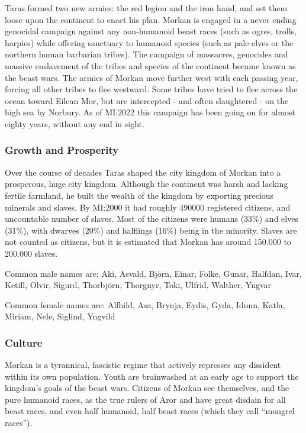 Taras formed two new armies: the red legion and the iron hand, and set them
loose upon the continent to enact his plan. Morkan is engaged in a never
ending genocidal campaign against any non-humanoid beast races (such as ogres,
trolls, harpies) while offering sanctuary to humanoid species (such as pale
elves or the northern human barbarian tribes). The campaign of massacres,
genocides and massive enslavement of the tribes and species of the continent
became known as the beast wars. The armies of Morkan move further west with
each passing year, forcing all other tribes to flee westward. Some tribes have
tried to flee across the ocean toward Eilean Mor, but are intercepted - and
often slaughtered - on the high sea by Norbury. As of MI:2022 this campaign
has been going on for almost eighty years, without any end in sight.

\subsubsection{Growth and Prosperity}

Over the course of decades Taras shaped the city kingdom of Morkan into a
prosperous, huge city kingdom. Although the continent was harsh and lacking
fertile farmland, he built the wealth of the kingdom by exporting precious
minerals and slaves. By MI:2000 it had roughly 490000 registered citizens, and
uncountable number of slaves. Most of the citizens were humans (33\%) and
elves (31\%), with dwarves (20\%) and halflings (16\%) being in the
minority. Slaves are not counted as citizens, but it is estimated that Morkan
has around 150.000 to 200.000 slaves.

Common male names are: Aki, Asvald, Björn, Einar, Folke, Gunar, Halfdan, Ivar,
Ketill, Olvir, Sigurd, Thorbjörn, Thorgnyr, Toki, Ulfrid, Walther, Yngvar

Common female names are: Alfhild, Asa, Brynja, Eydis, Gyda, Idunn, Katla,
Miriam, Nele, Siglind, Yngvild

\subsubsection{Culture}

Morkan is a tyrannical, fascistic regime that actively represses any dissident
within its own population. Youth are brainwashed at an early age to support
the kingdom's goals of the beast wars. Citizens of Morkan see themselves, and
the pure humanoid races, as the true rulers of Aror and have great disdain for
all beast races, and even half humanoid, half beast races (which they call
``mongrel races'').

